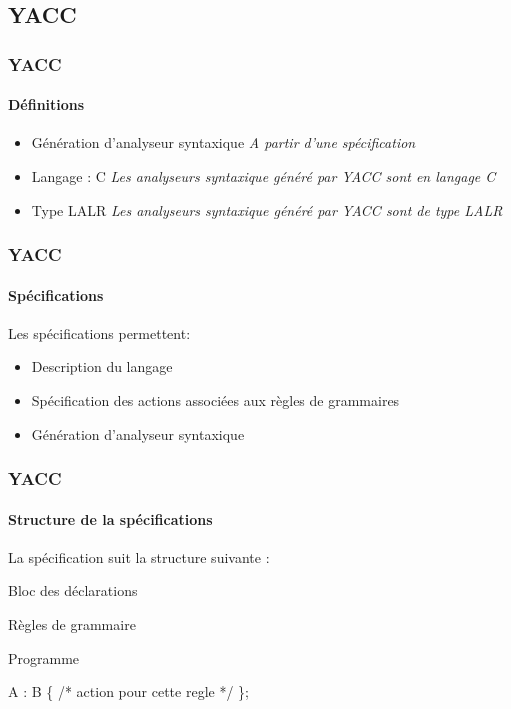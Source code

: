 \documentclass{beamer}
\begin{document}
\subsection{YACC}

\begin{frame}\frametitle{YACC}\framesubtitle{Définitions}

	\begin{itemize}
				\item Génération d'analyseur syntaxique\newline
						\subitem \textit{A partir d'une spécification}\newline
				\item Langage : C\newline
						\subitem \textit{Les analyseurs syntaxique généré par YACC sont en langage C}\newline
				\item Type LALR\newline
						\subitem \textit{Les analyseurs syntaxique généré par YACC sont de type LALR}\newline
	\end{itemize}

\end{frame}

\begin{frame}\frametitle{YACC}\framesubtitle{Spécifications}

	Les spécifications permettent:

	\begin{itemize}
				\item Description du langage\newline
				\item Spécification des actions associées aux règles de grammaires\newline
				\item Génération d'analyseur syntaxique\newline
	\end{itemize}

\end{frame}

\begin{frame}\frametitle{YACC}\framesubtitle{Structure de la spécifications}

La spécification suit la structure suivante :

Bloc des déclarations


Règles de grammaire


Programme

A : B \{ /* action pour cette regle */ \};

\end{frame}
\end{document}
